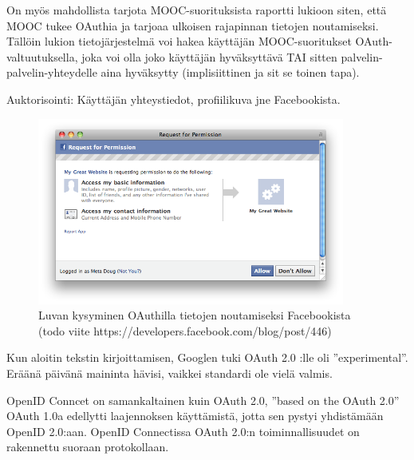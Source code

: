 \documentclass[finnish,gradu]{tktltiki}
\begin{document}
  On myös mahdollista tarjota MOOC-suorituksista raportti lukioon siten, että MOOC tukee OAuthia ja tarjoaa ulkoisen rajapinnan tietojen noutamiseksi. Tällöin lukion tietojärjestelmä voi hakea käyttäjän MOOC-suoritukset OAuth-valtuutuksella, joka voi olla joko käyttäjän hyväksyttävä TAI sitten palvelin-palvelin-yhteydelle aina hyväksytty (implisiittinen ja sit se toinen tapa).

  Auktorisointi: Käyttäjän yhteystiedot, profiilikuva jne Facebookista.

  \begin{figure}
    \centering
    \includegraphics[width=0.9\textwidth]{images/facebook_authorization_contact_info.png}
    \caption{Luvan kysyminen OAuthilla tietojen noutamiseksi Facebookista (todo viite https://developers.facebook.com/blog/post/446)}
    \label{fig:luvan_kysyminen_oauth_fb}
  \end{figure}

  Kun aloitin tekstin kirjoittamisen, Googlen tuki OAuth 2.0 :lle oli ''experimental''. Eräänä päivänä maininta hävisi, vaikkei standardi ole vielä valmis. %

  OpenID Conncet on samankaltainen kuin OAuth 2.0, ''based on the OAuth 2.0''
  OAuth 1.0a edellytti laajennoksen käyttämistä, jotta sen pystyi yhdistämään OpenID 2.0:aan. OpenID Connectissa OAuth 2.0:n toiminnallisuudet on rakennettu suoraan protokollaan.



\end{document}
